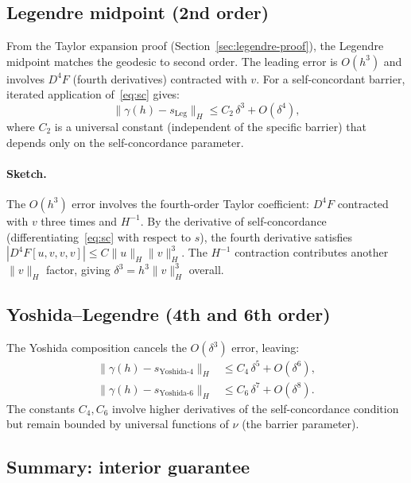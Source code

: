 \documentclass[11pt]{article}
\begin{document}
\subsection{Legendre midpoint (2nd order)}

From the Taylor expansion proof (Section~\ref{sec:legendre-proof}),
the Legendre midpoint matches the geodesic to second order.  The
leading error is $O(h^3)$ and involves $D^4 F$ (fourth derivatives)
contracted with $v$.  For a self-concordant barrier, iterated
application of~\eqref{eq:sc} gives:
\begin{equation}\label{eq:legendre-bound}
  \|\gamma(h) - s_{\text{Leg}}\|_H \leq C_2\, \delta^3 + O(\delta^4),
\end{equation}
where $C_2$ is a universal constant (independent of the specific barrier)
that depends only on the self-concordance parameter.

\paragraph{Sketch.}
The $O(h^3)$ error involves the fourth-order Taylor coefficient:
$D^4 F$ contracted with $v$ three times and $H^{-1}$.  By the
derivative of self-concordance (differentiating~\eqref{eq:sc}
with respect to $s$), the fourth derivative satisfies
$|D^4 F[u,v,v,v]| \leq C \|u\|_H \|v\|_H^3$.  The $H^{-1}$
contraction contributes another $\|v\|_H$ factor, giving
$\delta^3 = h^3 \|v\|_H^3$ overall.

\subsection{Yoshida--Legendre (4th and 6th order)}

The Yoshida composition cancels the $O(\delta^3)$ error, leaving:
\begin{align}
  \|\gamma(h) - s_{\text{Yoshida-4}}\|_H &\leq C_4\, \delta^5 + O(\delta^6), \\
  \|\gamma(h) - s_{\text{Yoshida-6}}\|_H &\leq C_6\, \delta^7 + O(\delta^8).
\end{align}
The constants $C_4, C_6$ involve higher derivatives of the
self-concordance condition but remain bounded by universal
functions of $\nu$ (the barrier parameter).

\subsection{Summary: interior guarantee}
\end{document}
